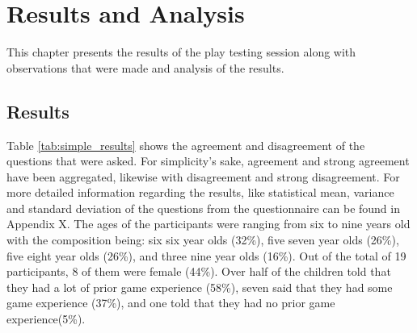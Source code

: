 \chapter{Results and Analysis}
This chapter presents the results of the play testing session along with observations that were made and analysis of the results.


\section{Results}
Table \ref{tab:simple_results} shows the agreement and disagreement of the questions that were asked. For simplicity's sake, agreement and strong agreement have been aggregated, likewise with disagreement and strong disagreement.
For more detailed information regarding the results, like statistical mean, variance and standard deviation of the questions from the questionnaire can be found in Appendix X.  The ages of the participants were ranging from six to nine years old with the composition being: six six year olds (32\%), five seven year olds (26\%), five eight year olds (26\%), and three nine year olds (16\%). Out of the total of 19 participants, 8 of them were female (44\%). Over half of the children told that they had a lot of prior game experience (58\%), seven said that they had some game experience (37\%), and one told that they had no prior game experience(5\%).


